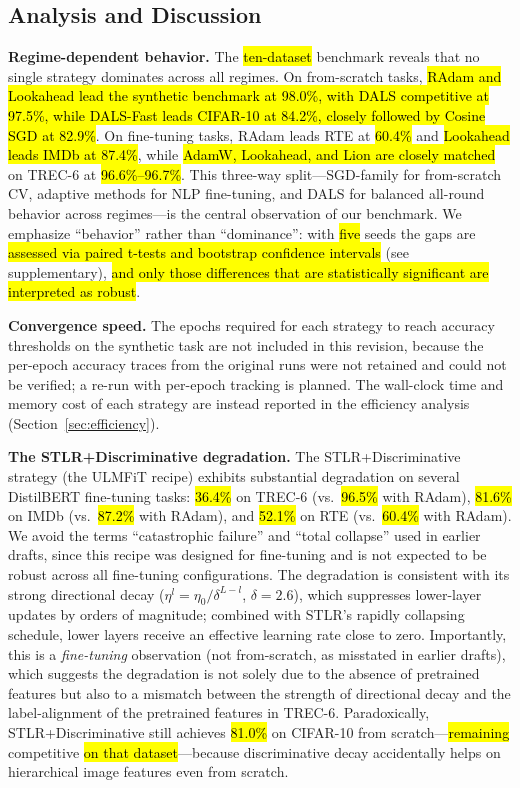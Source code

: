 \documentclass[a4paper,fleqn]{cas-dc}
\begin{document}
\subsection{Analysis and Discussion}\label{sec:analysis}

\textbf{Regime-dependent behavior.} The \hl{ten-dataset} benchmark reveals that no single strategy dominates across all regimes. On from-scratch tasks, \hl{RAdam and Lookahead lead the synthetic benchmark at 98.0\%, with DALS competitive at 97.5\%, while DALS-Fast leads CIFAR-10 at 84.2\%, closely followed by Cosine SGD at 82.9\%}. On fine-tuning tasks, RAdam leads RTE at \hl{60.4\%} and \hl{Lookahead leads IMDb at 87.4\%}, while \hl{AdamW, Lookahead, and Lion are closely matched} on TREC-6 at \hl{96.6\%--96.7\%}. This three-way split---SGD-family for from-scratch CV, adaptive methods for NLP fine-tuning, and DALS for balanced all-round behavior across regimes---is the central observation of our benchmark. We emphasize ``behavior'' rather than ``dominance'': with \hl{five} seeds the gaps are \hl{assessed via paired t-tests and bootstrap confidence intervals} (see supplementary), \hl{and only those differences that are statistically significant are interpreted as robust}.

\textbf{Convergence speed.} The epochs required for each strategy to reach accuracy thresholds on the synthetic task are not included in this revision, because the per-epoch accuracy traces from the original runs were not retained and could not be verified; a re-run with per-epoch tracking is planned. The wall-clock time and memory cost of each strategy are instead reported in the efficiency analysis (Section~\ref{sec:efficiency}).

{\sloppy \textbf{The STLR+Discriminative degradation.} The STLR+Discriminative strategy (the ULMFiT recipe) exhibits substantial degradation on several DistilBERT fine-tuning tasks: \hl{36.4\%} on TREC-6 (vs.\ \hl{96.5\%} with RAdam), \hl{81.6\%} on IMDb (vs.\ \hl{87.2\%} with RAdam), and \hl{52.1\%} on RTE (vs.\ \hl{60.4\%} with RAdam). We avoid the terms ``catastrophic failure'' and ``total collapse'' used in earlier drafts, since this recipe was designed for fine-tuning and is not expected to be robust across all fine-tuning configurations. The degradation is consistent with its strong directional decay ($\eta^l = \eta_0 / \delta^{L-l}$, $\delta=2.6$), which suppresses lower-layer updates by orders of magnitude; combined with STLR's rapidly collapsing schedule, lower layers receive an effective learning rate close to zero. Importantly, this is a \emph{fine-tuning} observation (not from-scratch, as misstated in earlier drafts), which suggests the degradation is not solely due to the absence of pretrained features but also to a mismatch between the strength of directional decay and the label-alignment of the pretrained features in TREC-6. Paradoxically, STLR+Discriminative still achieves \hl{81.0\%} on CIFAR-10 from scratch---\hl{remaining} competitive \hl{on that dataset}---because discriminative decay accidentally helps on hierarchical image features even from scratch.\par}
\end{document}
